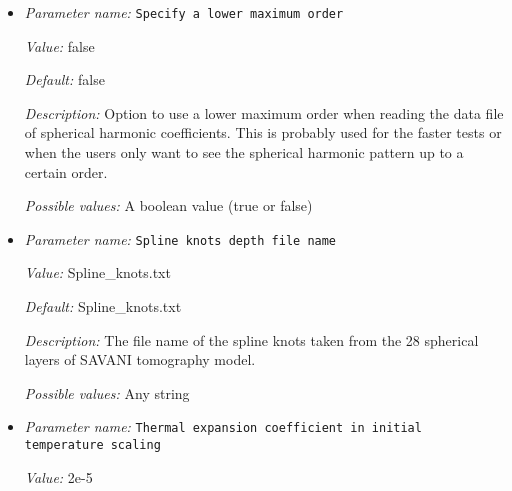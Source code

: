 \begin{itemize}
{\it Possible values:} A floating point number $v$ such that $-\text{MAX\_DOUBLE} \leq v \leq \text{MAX\_DOUBLE}$
\item {\it Parameter name:} {\tt Specify a lower maximum order}
\label{parameters:Initial temperature model/SAVANI perturbation/Specify a lower maximum order}
\label{parameters:Initial_20temperature_20model/SAVANI_20perturbation/Specify_20a_20lower_20maximum_20order}


{\it Value:} false


{\it Default:} false


{\it Description:} Option to use a lower maximum order when reading the data file of spherical harmonic coefficients. This is probably used for the faster tests or when the users only want to see the spherical harmonic pattern up to a certain order.


{\it Possible values:} A boolean value (true or false)
\item {\it Parameter name:} {\tt Spline knots depth file name}
\label{parameters:Initial temperature model/SAVANI perturbation/Spline knots depth file name}
\label{parameters:Initial_20temperature_20model/SAVANI_20perturbation/Spline_20knots_20depth_20file_20name}


{\it Value:} Spline\_knots.txt


{\it Default:} Spline\_knots.txt


{\it Description:} The file name of the spline knots taken from the 28 spherical layers of SAVANI tomography model.


{\it Possible values:} Any string
\item {\it Parameter name:} {\tt Thermal expansion coefficient in initial temperature scaling}
\label{parameters:Initial temperature model/SAVANI perturbation/Thermal expansion coefficient in initial temperature scaling}
\label{parameters:Initial_20temperature_20model/SAVANI_20perturbation/Thermal_20expansion_20coefficient_20in_20initial_20temperature_20scaling}


{\it Value:} 2e-5



\end{itemize}
